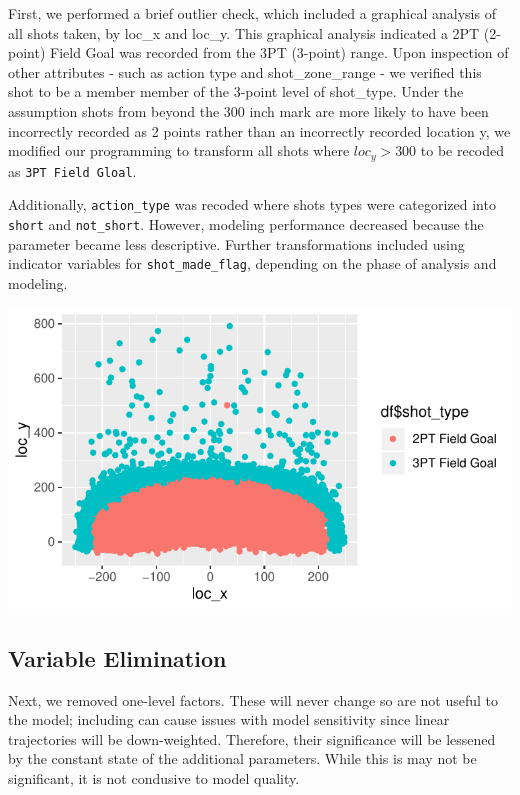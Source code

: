 \documentclass[american,]{article}
\begin{document}
First, we performed a brief outlier check, which included a graphical analysis of all shots taken, by loc\_x and loc\_y. This graphical analysis indicated a 2PT (2-point) Field Goal was recorded from the 3PT (3-point) range. Upon inspection of other attributes - such as action type and shot\_zone\_range - we verified this shot to be a member member of the 3-point level of shot\_type. Under the assumption shots from beyond the 300 inch mark are more likely to have been incorrectly recorded as 2 points rather than an incorrectly recorded location y, we modified our programming to transform all shots where \(loc_y > 300\) to be recoded as \texttt{3PT\ Field\ Gloal}.

Additionally, \texttt{action\_type} was recoded where shots types were categorized into \texttt{short} and \texttt{not\_short}. However, modeling performance decreased because the parameter became less descriptive. Further transformations included using indicator variables for \texttt{shot\_made\_flag}, depending on the phase of analysis and modeling.

\includegraphics{Final_Project_Applied_files/figure-latex/outlier check-1.pdf}

\hypertarget{variable-elimination}{%
\subsection{\texorpdfstring{\textbf{Variable Elimination}}{Variable Elimination}}\label{variable-elimination}}

Next, we removed one-level factors. These will never change so are not useful to the model; including can cause issues with model sensitivity since linear trajectories will be down-weighted. Therefore, their significance will be lessened by the constant state of the additional parameters. While this is may not be significant, it is not condusive to model quality.
\end{document}
